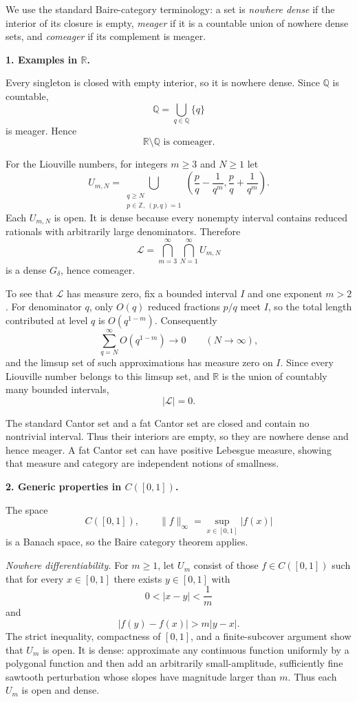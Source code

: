 \begin{solution}
We use the standard Baire-category terminology: a set is \emph{nowhere dense} if
the interior of its closure is empty, \emph{meager} if it is a countable union
of nowhere dense sets, and \emph{comeager} if its complement is meager.

\par\smallskip\noindent\textbf{1. Examples in \(\mathbb R\).}

Every singleton is closed with empty interior, so it is nowhere dense. Since
\(\mathbb Q\) is countable,
\[
\mathbb Q=\bigcup_{q\in\mathbb Q}\{q\}
\]
is meager. Hence
\[
\boxed{\mathbb R\setminus\mathbb Q\text{ is comeager}.}
\]

For the Liouville numbers, for integers \(m\ge3\) and \(N\ge1\) let
\[
U_{m,N}
=
\bigcup_{\substack{q\ge N\\ p\in\mathbb Z,\ (p,q)=1}}
\left(
\frac pq-\frac1{q^m},
\frac pq+\frac1{q^m}
\right).
\]
Each \(U_{m,N}\) is open. It is dense because every nonempty interval contains
reduced rationals with arbitrarily large denominators. Therefore
\[
\mathcal L
=
\bigcap_{m=3}^\infty
\bigcap_{N=1}^\infty
U_{m,N}
\]
is a dense \(G_\delta\), hence comeager.

To see that \(\mathcal L\) has measure zero, fix a bounded interval \(I\) and
one exponent \(m>2\). For denominator \(q\), only \(O(q)\) reduced fractions
\(p/q\) meet \(I\), so the total length contributed at level \(q\) is
\(O(q^{1-m})\). Consequently
\[
\sum_{q=N}^\infty O(q^{1-m})\longrightarrow0
\qquad(N\to\infty),
\]
and the limsup set of such approximations has measure zero on \(I\).
Since every Liouville number belongs to this limsup set, and
\(\mathbb R\) is the union of countably many bounded intervals,
\[
\boxed{|\mathcal L|=0.}
\]

The standard Cantor set and a fat Cantor set are closed and contain no
nontrivial interval. Thus their interiors are empty, so they are nowhere
dense and hence meager. A fat Cantor set can have positive Lebesgue measure,
showing that measure and category are independent notions of smallness.

\par\smallskip\noindent\textbf{2. Generic properties in \(C([0,1])\).}

The space
\[
C([0,1]),\qquad \|f\|_\infty=\sup_{x\in[0,1]}|f(x)|
\]
is a Banach space, so the Baire category theorem applies.

\smallskip
\noindent\emph{Nowhere differentiability.}
For \(m\ge1\), let \(U_m\) consist of those \(f\in C([0,1])\) such that for
every \(x\in[0,1]\) there exists \(y\in[0,1]\) with
\[
0<|x-y|<\frac1m
\]
and
\[
|f(y)-f(x)|>m|y-x|.
\]
The strict inequality, compactness of \([0,1]\), and a finite-subcover
argument show that \(U_m\) is open. It is dense: approximate any continuous
function uniformly by a polygonal function and then add an arbitrarily
small-amplitude, sufficiently fine sawtooth perturbation whose slopes have
magnitude larger than \(m\). Thus each \(U_m\) is open and dense.


\end{solution}
